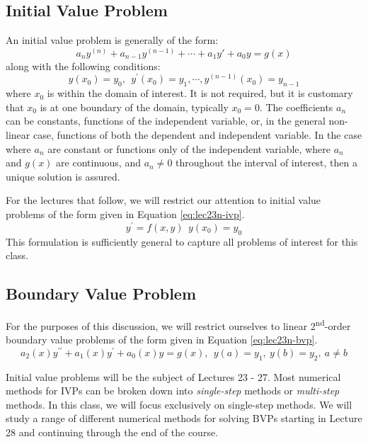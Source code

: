 \subsection{Initial Value Problem}
An initial value problem is generally of the form:
\begin{equation*}
a_ny^{(n)}+a_{n-1}y^{(n-1)}+ \cdots + a_{1}y{\prime} + a_0y = g(x)
\end{equation*}
along with the following conditions:
\begin{equation*}
y(x_0) = y_0, \ \ y^{\prime}(x_0) = y_1, \cdots,y^{(n-1)}(x_0)=y_{n-1}
\end{equation*}
where $x_0$ is within the domain of interest.  It is not required, but it is customary that $x_0$ is at one boundary of the domain, typically $x_0=0$. The coefficients $a_n$ can be constants, functions of the independent variable, or, in the general non-linear case, functions of both the dependent and independent variable.  In the case where $a_n$ are constant or functions only of the independent variable, where $a_n$ and $g(x)$ are continuous, and $a_n \ne 0$ throughout the interval of interest, then a unique solution is assured.

For the lectures that follow, we will restrict our attention to initial value problems of the form given in Equation \ref{eq:lec23n-ivp}.
\begin{equation}
y^{\prime} = f(x,y) \ \ y(x_0) = y_0
\label{eq:lec23n-ivp}
\end{equation}
This formulation is sufficiently general to capture all problems of interest for this class.

\subsection{Boundary Value Problem}
For the purposes of this discussion, we will restrict ourselves to linear 2\textsuperscript{nd}-order boundary value problems of the form given in Equation \ref{eq:lec23n-bvp}.
\begin{equation}
a_2(x)y^{\prime \prime} + a_1(x)y^{\prime} + a_0(x)y = g(x), \ \ y(a) = y_1, \ y(b) = y_2, \ a \ne b
\label{eq:lec23n-bvp}
\end{equation}

Initial value problems will be the subject of Lectures 23 - 27.  Most numerical methods for IVPs can be broken down into \emph{single-step} methods or \emph{multi-step} methods.  In this class, we will focus exclusively on single-step methods.  We will study a range of different numerical methods for solving BVPs starting in Lecture 28 and continuing through the end of the course.

